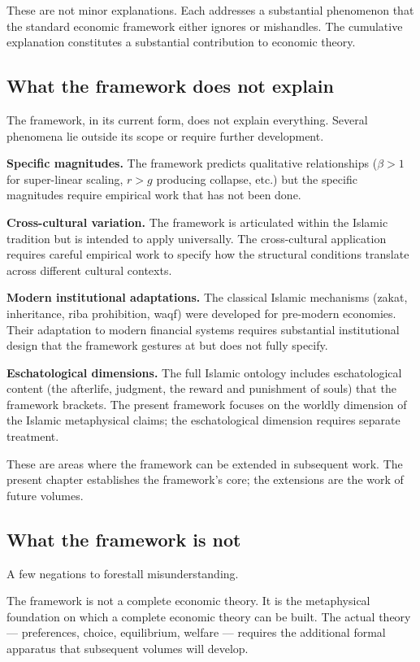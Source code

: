 These are not minor explanations. Each addresses a substantial
phenomenon that the standard economic framework either ignores or
mishandles. The cumulative explanation constitutes a substantial
contribution to economic theory.

\subsection{What the framework does not explain}

The framework, in its current form, does not explain everything.
Several phenomena lie outside its scope or require further
development.

\textbf{Specific magnitudes.} The framework predicts qualitative
relationships ($\beta > 1$ for super-linear scaling, $r > g$
producing collapse, etc.) but the specific magnitudes require
empirical work that has not been done.

\textbf{Cross-cultural variation.} The framework is articulated
within the Islamic tradition but is intended to apply universally.
The cross-cultural application requires careful empirical work to
specify how the structural conditions translate across different
cultural contexts.

\textbf{Modern institutional adaptations.} The classical Islamic
mechanisms (zakat, inheritance, riba prohibition, waqf) were
developed for pre-modern economies. Their adaptation to modern
financial systems requires substantial institutional design that
the framework gestures at but does not fully specify.

\textbf{Eschatological dimensions.} The full Islamic ontology
includes eschatological content (the afterlife, judgment, the
reward and punishment of souls) that the framework brackets. The
present framework focuses on the worldly dimension of the Islamic
metaphysical claims; the eschatological dimension requires
separate treatment.

These are areas where the framework can be extended in subsequent
work. The present chapter establishes the framework's core; the
extensions are the work of future volumes.

\subsection{What the framework is not}

A few negations to forestall misunderstanding.

The framework is not a complete economic theory. It is the
metaphysical foundation on which a complete economic theory can
be built. The actual theory --- preferences, choice, equilibrium,
welfare --- requires the additional formal apparatus that
subsequent volumes will develop.

